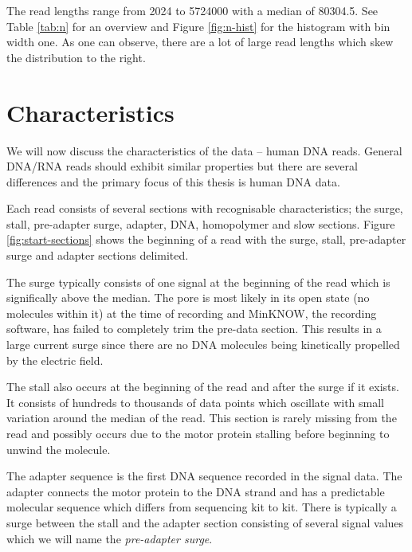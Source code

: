 


The read lengths range from 2024 to \num{5724000} with a median of 80304.5. See Table \ref{tab:n} for an overview and Figure \ref{fig:n-hist} for the histogram with bin width one. As one can observe, there are a lot of large read lengths which skew the distribution to the right.




\section{Characteristics}

We will now discuss the characteristics of the data -- human DNA reads. General DNA/RNA reads should exhibit similar properties but there are several differences and the primary focus of this thesis is human DNA data.

Each read consists of several sections with recognisable characteristics; the surge, stall, pre-adapter surge, adapter, DNA, homopolymer and slow sections. Figure \ref{fig:start-sections} shows the beginning of a read with the surge, stall, pre-adapter surge and adapter sections delimited.

The surge typically consists of one signal at the beginning of the read which is significally above the median. The pore is most likely in its open state (no molecules within it) at the time of recording and MinKNOW, the recording software, has failed to completely trim the pre-data section. This results in a large current surge since there are no DNA molecules being kinetically propelled by the electric field.

The stall also occurs at the beginning of the read and after the surge if it exists. It consists of hundreds to thousands of data points which oscillate with small variation around the median of the read. This section is rarely missing from the read and possibly occurs due to the motor protein stalling before beginning to unwind the molecule.

The adapter sequence is the first DNA sequence recorded in the signal data. The adapter connects the motor protein to the DNA strand and has a predictable molecular sequence which differs from sequencing kit to kit. There is typically a surge between the stall and the adapter section consisting of several signal values which we will name the \textit{pre-adapter surge}.

